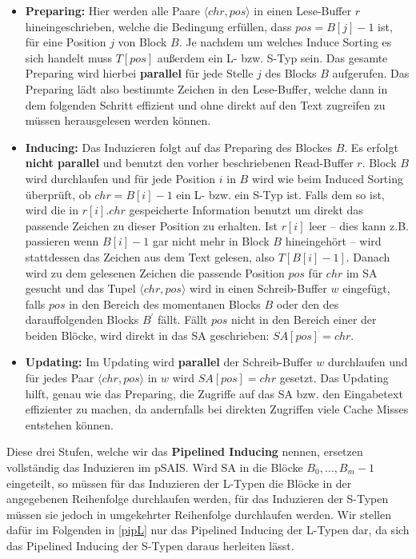 \begin{itemize}
\item \textbf{Preparing:} Hier werden alle Paare $\langle chr, pos \rangle$ in einen Lese-Buffer $r$ hineingeschrieben, welche die Bedingung erfüllen, dass $pos = B[j]-1$ ist, für eine Position $j$ von Block $B$. Je nachdem um welches Induce Sorting es sich handelt muss $T[pos]$ außerdem ein L- bzw. S-Typ sein. Das gesamte Preparing wird hierbei \textbf{parallel} für jede Stelle $j$ des Blocks $B$ aufgerufen. Das Preparing lädt also bestimmte Zeichen in den Lese-Buffer, welche dann in dem folgenden Schritt effizient und ohne direkt auf den Text zugreifen zu müssen herausgelesen werden können.

\item \textbf{Inducing:} Das Induzieren folgt auf das Preparing des Blockes $B$. Es erfolgt \textbf{nicht parallel} und benutzt den vorher beschriebenen Read-Buffer $r$. Block $B$ wird durchlaufen und für jede Position $i$ in $B$ wird wie beim Induced Sorting überprüft, ob $chr = B[i]-1$ ein L- bzw. ein S-Typ ist. Falls dem so ist, wird die in $r[i].chr$ gespeicherte Information benutzt um direkt das passende Zeichen zu dieser Position zu erhalten. Ist $r[i]$ leer -- dies kann z.B. passieren wenn $B[i]-1$ gar nicht mehr in Block $B$ hineingehört -- wird stattdessen das Zeichen aus dem Text gelesen, also $T[B[i]-1]$. Danach wird zu dem gelesenen Zeichen die passende Position $pos$ für $chr$ im SA gesucht und das Tupel $\langle chr, pos \rangle$ wird in einen Schreib-Buffer $w$ eingefügt, falls $pos$ in den Bereich des momentanen Blocks $B$ oder den des darauffolgenden Blocks $B^\prime$ fällt. Fällt $pos$ nicht in den Bereich einer der beiden Blöcke, wird direkt in das SA geschrieben: $SA[pos] = chr$.

\item \textbf{Updating:} Im Updating wird \textbf{parallel} der Schreib-Buffer $w$ durchlaufen und für jedes Paar $\langle chr, pos \rangle$ in $w$ wird $SA[pos] = chr$ gesetzt. Das Updating hilft, genau wie das Preparing, die Zugriffe auf das SA bzw. den Eingabetext effizienter zu machen, da andernfalls bei direkten Zugriffen viele Cache Misses entstehen können.
\end{itemize}

Diese drei Stufen, welche wir das \textbf{Pipelined Inducing} nennen, ersetzen vollständig das Induzieren im pSAIS. Wird SA in die Blöcke $B_0, \ldots, B_m-1$ eingeteilt, so müssen für das Induzieren der L-Typen die Blöcke in der angegebenen Reihenfolge durchlaufen werden, für das Induzieren der S-Typen müssen sie jedoch in umgekehrter Reihenfolge durchlaufen werden. Wir stellen dafür im Folgenden in \ref{pipL} nur das Pipelined Inducing der L-Typen dar, da sich das Pipelined Inducing der S-Typen daraus herleiten lässt.

